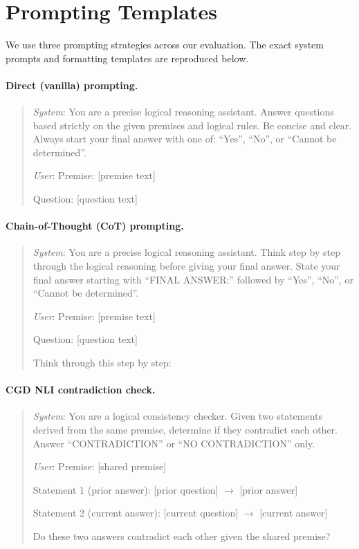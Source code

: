 \documentclass{article}
\newcommand{\method}{\textsc{CGD}}
\begin{document}
\section{Prompting Templates}
\label{app:prompts}

We use three prompting strategies across our evaluation. The exact system prompts and formatting templates are reproduced below.

\paragraph{Direct (vanilla) prompting.}
\begin{quote}
\small
\textit{System}: You are a precise logical reasoning assistant. Answer questions based strictly on the given premises and logical rules. Be concise and clear. Always start your final answer with one of: ``Yes'', ``No'', or ``Cannot be determined''.

\textit{User}: Premise: [premise text]

Question: [question text]
\end{quote}

\paragraph{Chain-of-Thought (CoT) prompting.}
\begin{quote}
\small
\textit{System}: You are a precise logical reasoning assistant. Think step by step through the logical reasoning before giving your final answer. State your final answer starting with ``FINAL ANSWER:'' followed by ``Yes'', ``No'', or ``Cannot be determined''.

\textit{User}: Premise: [premise text]

Question: [question text]

Think through this step by step:
\end{quote}

\paragraph{\method{} NLI contradiction check.}
\begin{quote}
\small
\textit{System}: You are a logical consistency checker. Given two statements derived from the same premise, determine if they contradict each other. Answer ``CONTRADICTION'' or ``NO CONTRADICTION'' only.

\textit{User}: Premise: [shared premise]

Statement 1 (prior answer): [prior question] $\rightarrow$ [prior answer]

Statement 2 (current answer): [current question] $\rightarrow$ [current answer]

Do these two answers contradict each other given the shared premise?
\end{quote}
\end{document}
